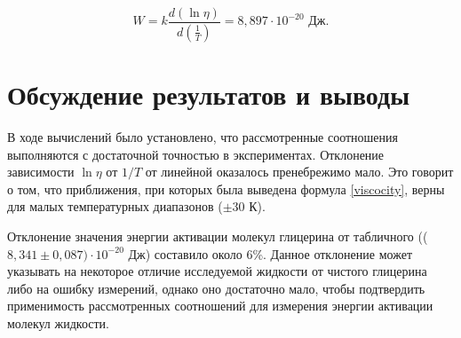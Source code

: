 \documentclass[a4paper,12pt]{article} %
\begin{document}
\begin{equation}
    W = k\frac{d(\ln{\eta})}{d(\frac{1}{T})} = 8,897 \cdot 10^{-20} \text{ Дж}.
\end{equation}

\section{Обсуждение результатов и выводы}

В ходе вычислений было установлено, что рассмотренные соотношения выполняются с достаточной точностью в экспериментах. Отклонение зависимости $\ln{\eta}$ от $1/T$ от линейной оказалось пренебрежимо мало. Это говорит о том, что приближения, при которых была выведена формула \eqref{viscocity}, верны для малых температурных диапазонов ($\pm 30$ К). 

Отклонение значения энергии активации молекул глицерина от табличного (($8,341 \pm 0,087)\cdot 10^{-20}$ Дж) составило около 6\%. Данное отклонение может указывать на некоторое отличие исследуемой жидкости от чистого глицерина либо на ошибку измерений, однако оно достаточно мало, чтобы подтвердить применимость рассмотренных соотношений для измерения энергии активации молекул жидкости.
\end{document}
